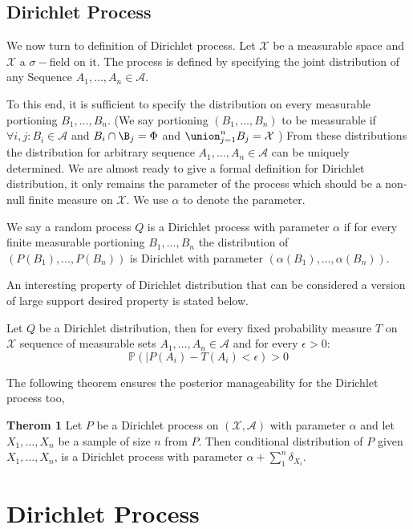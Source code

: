 \documentclass{article}
\begin{document}
\subsection{Dirichlet Process}
We now turn to definition of Dirichlet process. Let $ \mathcal{X}$  be a measurable space
and $ \mathcal{X} $  a $\sigma-$field on it. The process is defined by specifying the joint distribution of any
Sequence $A_1, \ldots, A_n \in \mathcal{A}$.

To this end, it is sufficient to specify the distribution on every measurable portioning $B_1, \ldots, B_n$.
(We say portioning $(B_1, \ldots, B_n)$ to be measurable if $\forall i,j: B_i \in \mathcal{A}$ and $B_i \cap \B_j = \Phi$ and $\union_{j=1}^n B_j = \mathcal{X}$ )
From these distributions the distribution for arbitrary sequence $A_1, \ldots, A_n \in \mathcal{A}$ can be uniquely determined.
We are almost ready to give a formal definition for Dirichlet distribution, it only remains
the parameter of the process which should be a non-null finite measure on $\mathcal{X}$. We use $\alpha$ to denote the parameter.

We say a random process $Q$ is a Dirichlet process with parameter $\alpha$ if for every finite measurable portioning $B_1, \ldots, B_n$
the distribution of $(P(B_1), \ldots, P(B_n))$ is  Dirichlet with parameter $(\alpha(B_1), \ldots, \alpha(B_n))$.

An interesting property of Dirichlet distribution that can be considered a version of large support desired property is stated below.

Let $Q$ be a Dirichlet distribution, then for every fixed probability measure $T$ on $\mathcal{X}$ sequence of measurable sets
$A_1, \ldots, A_n \in \mathcal{A}$ and for every $\epsilon > 0$:
\begin{equation}
  \mathbb{P}(|P(A_i) - T(A_i) <\epsilon) > 0
\end{equation}

The following theorem ensures the posterior manageability for the Dirichlet process too,

\textbf{Therom 1} Let $P$ be a Dirichlet process on $(\mathcal{X},\mathcal{A})$ with parameter $\alpha $ and let $X_1,\ldots, X_n$
be a sample of size $n$ from $P$.
Then conditional distribution of $P$ given $ X_1, \ldots , X_n$, is a Dirichlet process with parameter $\alpha + \sum_{1}^n \delta_{X_i}$.




\section{Dirichlet Process}
\end{document}
